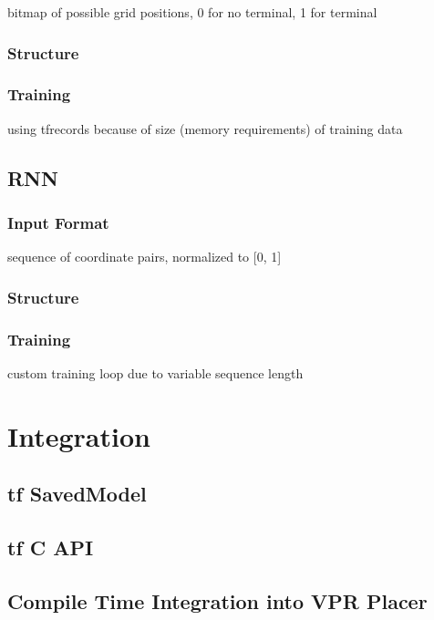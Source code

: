 bitmap of possible grid positions, 0 for no terminal, 1 for terminal

\subsubsection{Structure}

\subsubsection{Training}

using tfrecords because of size (memory requirements) of training data

\subsection{\gls{RNN}}

\subsubsection{Input Format}

sequence of coordinate pairs, normalized to [0, 1]

\subsubsection{Structure}

\subsubsection{Training}

custom training loop due to variable sequence length

\section{Integration}

\subsection{\gls{tf} SavedModel}

\subsection{\gls{tf} C API}

\subsection{Compile Time Integration into \gls{VPR} Placer}
